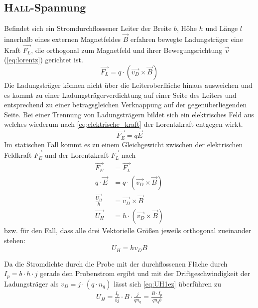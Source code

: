     \subsection{\textsc{Hall}-Spannung}
        Befindet sich ein Stromdurchflossener Leiter der Breite \(b\), Höhe \(h\) und Länge \(l\) innerhalb eines externen Magnetfeldes
        \( \vec{B} \) erfahren bewegte Ladungsträger eine Kraft \(\vec{F_L}\), die orthogonal zum Magnetfeld und ihrer Bewegungsrichtung
        \( \vec{v} \) (\cref{eq:lorentz}) gerichtet ist.
        \begin{equation}
            \vec{F_L} = q \cdot (\vec{v_D} \times \vec{B})%
            \label{eq:lorentz}
        \end{equation}
        Die Ladungsträger können nicht über die Leiteroberfläche hinaus ausweichen und es kommt zu einer Ladungsträgerverdichtung
        auf einer Seite des Leiters und entsprechend zu einer betragsgleichen Verknappung auf der gegenüberliegenden Seite. Bei
        einer Trennung von Ladungsträgern bildet sich ein elektrisches Feld aus welches wiederum nach \cref{eq:elektrische_kraft}
        der Lorentzkraft entgegen wirkt.
        \begin{equation}
            \vec{F_E} = q \vec{E}
            \label{eq:elektrische_kraft}
        \end{equation}
        Im statischen Fall kommt es zu einem Gleichgewicht zwischen der elektrischen Feldkraft \(\vec{F_E}\) und der Lorentzkraft
        \(\vec{F_L}\) nach
        \begin{align}
            \vec{F_E} &= \vec{F_L} \nonumber\\
            q \cdot \vec{E} &= q \cdot (\vec{v_D} \times \vec{B}) \nonumber\\
            \frac{\vec{U_H}}{h} &= \vec{v_D} \times \vec{B} \nonumber\\
            \vec{U_H} &= h \cdot (\vec{v_D} \times \vec{B})
            \label{eq:UH1}
        \end{align}
        bzw. für den Fall, dass alle drei Vektorielle Größen jeweils orthogonal zueinander stehen:
        \begin{equation}
            U_H = h v_D B
            \label{eq:UH1ez}
        \end{equation}

        Da die Stromdichte durch die Probe mit der durchflossenen Fläche durch \(I_p = b\cdot h \cdot j\) gerade den Probenstrom ergibt
        und mit der Driftgeschwindigkeit der Ladungsträger als \(v_D=j \cdot (q\cdot n_q)\) lässt sich \cref{eq:UH1ez} überführen zu
        \begin{align}
            U_H = \frac{I_p}{b j} \cdot B \cdot \frac{j}{q n_q} = \frac{B \cdot I_p}{q n_q b}
            \label{eq:UH2}
        \end{align}
